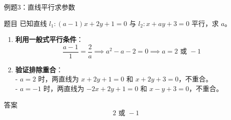 \begin{frame}{例题3：直线平行求参数}
  \begin{block}{题目}
      已知直线 \( l_1 : (a-1) x + 2 y +1 = 0 \) 与 \( l_2 :x+ay+3 = 0 \) 平行，求 \( a \)。
  \end{block}
  \pause
  \begin{enumerate}
      \item \textbf{利用一般式平行条件}：\\
          \[
          \frac{a-1}{1} = \frac{2}{a} \implies a^2 - a - 2 = 0 \implies a = 2 \text{ 或 } -1
          \]

      \item \textbf{验证排除重合}：\\
          - \( a=2 \) 时，两直线为 \( x+2y+1=0 \) 和 \( x+2y+3=0 \)，不重合。\\
          - \( a=-1 \) 时，两直线为 \( -2x+2y+1=0 \) 和 \( x-y+3=0 \)，不重合。
  \end{enumerate}


  \begin{block}{答案}
      \[
      \boxed{2 \text{ 或 } -1}
      \]
  \end{block}
\end{frame}


